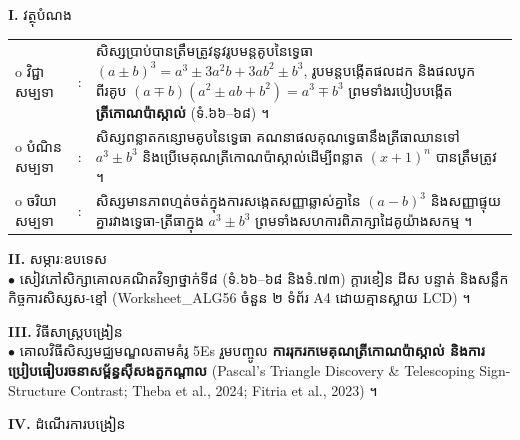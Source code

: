 \documentclass[a4paper,10pt]{article}
\newcommand{\wcirc}{{\CourierBullet\fontsize{9.5pt}{11pt}\selectfont o}}
\newcommand{\en}[1]{{\TimesEn #1}}
\begin{document}
\textbf{I.} {\muol វត្ថុបំណង}\\[1pt]
\hspace*{0.55cm}%
\begin{tabular}{@{}l l L{14.2cm}@{}}
  \wcirc \hspace{0.25cm} វិជ្ជាសម្បទា & : & សិស្សប្រាប់បានត្រឹមត្រូវនូវរូបមន្តគូបនៃទ្វេធា $(a\pm b)^3 = a^3 \pm 3a^2b + 3ab^2 \pm b^3$, រូបមន្តបង្កើតផលដក និងផលបូកពីរគូប $(a\mp b)(a^2\pm ab+b^2) = a^3\mp b^3$ ព្រមទាំងរបៀបបង្កើត \textbf{ត្រីកោណប៉ាស្កាល់} (ទំ.៦៦--៦៨) ។ \\
  \wcirc \hspace{0.25cm} បំណិនសម្បទា & : & សិស្សពន្លាតកន្សោមគូបនៃទ្វេធា គណនាផលគុណទ្វេធានឹងត្រីធាឈានទៅ $a^3\pm b^3$ និងប្រើមេគុណត្រីកោណប៉ាស្កាល់ដើម្បីពន្លាត $(x+1)^n$ បានត្រឹមត្រូវ ។ \\
  \wcirc \hspace{0.25cm} ចរិយាសម្បទា & : & សិស្សមានភាពហ្មត់ចត់ក្នុងការសង្កេតសញ្ញាឆ្លាស់គ្នានៃ $(a-b)^3$ និងសញ្ញាផ្ទុយគ្នារវាងទ្វេធា-ត្រីធាក្នុង $a^3\pm b^3$ ព្រមទាំងសហការពិភាក្សាដៃគូយ៉ាងសកម្ម ។ \\
\end{tabular}

\vspace{1pt}

\textbf{II.} {\muol សម្ភារៈឧបទេស}\\[1pt]
\hspace*{0.55cm}$\bullet$ \hspace{0.35cm} សៀវភៅសិក្សាគោលគណិតវិទ្យាថ្នាក់ទី៨ (ទំ.៦៦--៦៨ និងទំ.៧៣) ក្ដារខៀន ដីស បន្ទាត់ និងសន្លឹកកិច្ចការសិស្សស-ខ្មៅ (\en{Worksheet\_ALG56} ចំនួន ២ ទំព័រ \en{A4} ដោយគ្មានស្លាយ \en{LCD}) ។

\vspace{1pt}

\textbf{III.} {\muol វិធីសាស្រ្តបង្រៀន}\\[1pt]
\hspace*{0.55cm}$\bullet$ \hspace{0.35cm} គោលវិធីសិស្សមជ្ឈមណ្ឌលតាមគំរូ \en{5Es} រួមបញ្ចូល \textbf{ការរុករកមេគុណត្រីកោណប៉ាស្កាល់ និងការប្រៀបធៀបរចនាសម្ព័ន្ធស៊ីសងតួកណ្ដាល} (\en{Pascal's Triangle Discovery \& Telescoping Sign-Structure Contrast}; \en{Theba et al., 2024; Fitria et al., 2023}) ។

\vspace{2pt}

\textbf{IV.} {\muol ដំណើរការបង្រៀន}\\[-6pt]
\end{document}
